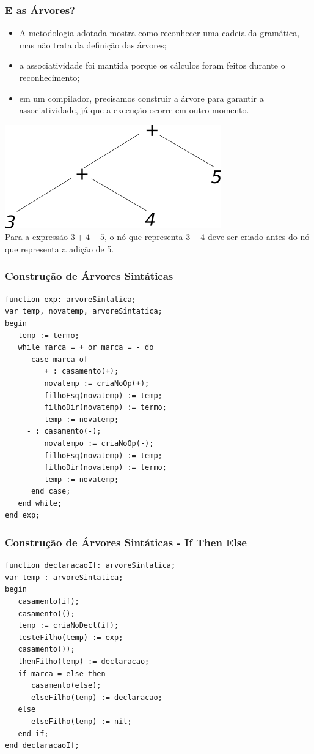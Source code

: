 \documentclass[table]{beamer}
\begin{document}
\begin{frame}
   \frametitle{E as Árvores?}
   \begin{itemize}
      \item A metodologia adotada mostra como reconhecer uma cadeia da gramática, mas não trata da definição das árvores;
      \item a associatividade foi mantida porque os cálculos foram feitos durante o reconhecimento;
      \item em um compilador, precisamos construir a árvore para garantir a associatividade, já que a execução ocorre em outro momento.
   \end{itemize}
   \centering
   \includegraphics[scale=0.5]{figuras/arvore_abstrata.png} \\
   \vspace{1.0cm}
   Para a expressão $3+4+5$, o nó que representa $3+4$ deve ser criado antes do nó que representa a adição de 5.
\end{frame}

\begin{frame}[fragile]
   \frametitle{Construção de Árvores Sintáticas}
   \small
   \begin{verbatim}
function exp: arvoreSintatica;
var temp, novatemp, arvoreSintatica;
begin
   temp := termo;
   while marca = + or marca = - do
      case marca of
         + : casamento(+);
	     novatemp := criaNoOp(+);
	     filhoEsq(novatemp) := temp;
	     filhoDir(novatemp) := termo;
	     temp := novatemp;
	 - : casamento(-);
	     novatempo := criaNoOp(-);
	     filhoEsq(novatemp) := temp;
	     filhoDir(novatemp) := termo;
	     temp := novatemp;
      end case;
   end while;
end exp;
   \end{verbatim}
\end{frame}

\begin{frame}[fragile]
   \frametitle{Construção de Árvores Sintáticas - If Then Else}
   \small
   \begin{verbatim}
function declaracaoIf: arvoreSintatica;
var temp : arvoreSintatica;
begin
   casamento(if);
   casamento(();
   temp := criaNoDecl(if);
   testeFilho(temp) := exp;
   casamento());
   thenFilho(temp) := declaracao;
   if marca = else then
      casamento(else);
      elseFilho(temp) := declaracao;
   else
      elseFilho(temp) := nil;
   end if;
end declaracaoIf;
   \end{verbatim}
\end{frame}
\end{document}
